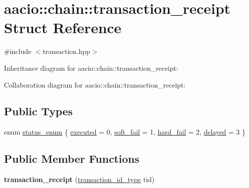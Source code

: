 \hypertarget{structaacio_1_1chain_1_1transaction__receipt}{}\section{aacio\+:\+:chain\+:\+:transaction\+\_\+receipt Struct Reference}
\label{structaacio_1_1chain_1_1transaction__receipt}


{\ttfamily \#include $<$transaction.\+hpp$>$}



Inheritance diagram for aacio\+:\+:chain\+:\+:transaction\+\_\+receipt\+:


Collaboration diagram for aacio\+:\+:chain\+:\+:transaction\+\_\+receipt\+:
\subsection*{Public Types}
\begin{DoxyCompactItemize}
\item 
enum \mbox{\hyperlink{structaacio_1_1chain_1_1transaction__receipt_aa2bcda79342889b1b3de6f5819e27e11}{status\+\_\+enum}} \{ \mbox{\hyperlink{structaacio_1_1chain_1_1transaction__receipt_aa2bcda79342889b1b3de6f5819e27e11a394ffb3ca47c58cc4a25b1493034e992}{executed}} = 0, 
\mbox{\hyperlink{structaacio_1_1chain_1_1transaction__receipt_aa2bcda79342889b1b3de6f5819e27e11abc455d4cb98bc62d92e872fdf0d60225}{soft\+\_\+fail}} = 1, 
\mbox{\hyperlink{structaacio_1_1chain_1_1transaction__receipt_aa2bcda79342889b1b3de6f5819e27e11adec30d16a82b049c293b4828269f38f1}{hard\+\_\+fail}} = 2, 
\mbox{\hyperlink{structaacio_1_1chain_1_1transaction__receipt_aa2bcda79342889b1b3de6f5819e27e11a7042dcb4d18e4e4de61dffd83501e865}{delayed}} = 3
 \}
\end{DoxyCompactItemize}
\subsection*{Public Member Functions}
\begin{DoxyCompactItemize}
\item 
\mbox{\label{structaacio_1_1chain_1_1transaction__receipt_a22908355ddebe9a88bb8a1ed1d61fb9f}} 
{\bfseries transaction\+\_\+receipt} (\mbox{\hyperlink{classfc_1_1sha256}{transaction\+\_\+id\+\_\+type}} tid)
\end{DoxyCompactItemize}
